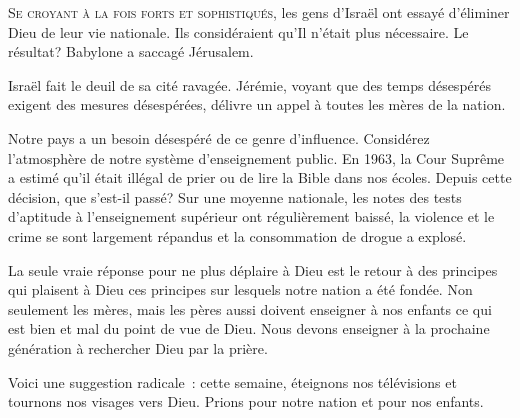 




\lettrine{S}{e croyant à la fois forts et sophistiqués,}
 les gens d'Israël ont essayé d'éliminer Dieu de leur vie nationale.
 Ils considéraient qu'Il n'était plus nécessaire.
 Le résultat? Babylone a saccagé Jérusalem. 

Israël fait le deuil de sa cité ravagée.
 Jérémie, voyant que des temps désespérés exigent des mesures
 désespérées, délivre un appel à toutes les mères de la nation. 


Notre pays a un besoin désespéré de ce genre d'influence.
 Considérez l'atmosphère de notre système d'enseignement public.
 En 1963, la Cour Suprême a estimé qu'il était illégal de prier
 ou de lire la Bible dans nos écoles.
 Depuis cette décision, que s'est-il passé?
 Sur une moyenne nationale, les notes des tests d'aptitude
 à l'enseignement supérieur ont régulièrement baissé,
 la violence et le crime se sont largement répandus
 et la consommation de drogue a explosé. 

La seule vraie réponse pour ne plus déplaire à Dieu
 est le retour à des principes qui plaisent à Dieu
 \ocadr ces principes sur lesquels notre nation a été fondée.
 Non seulement les mères, mais les pères aussi doivent enseigner
 à nos enfants ce qui est bien et mal \ocadr du point de vue de Dieu.
 Nous devons enseigner à la prochaine génération à rechercher Dieu
 par la prière. 

Voici une suggestion radicale~: cette semaine, éteignons nos télévisions
 et tournons nos visages vers Dieu.
 Prions pour notre nation et pour nos enfants. 

\dvrule



